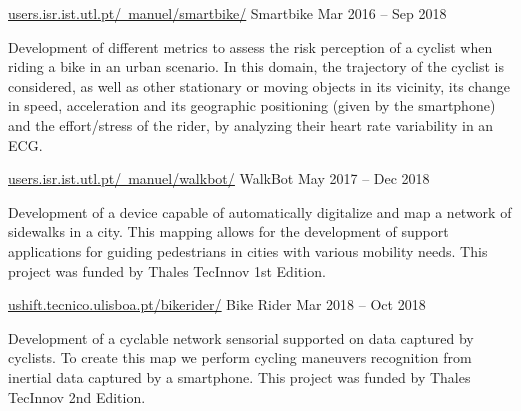 

\begin{cventries}

  \cventrynograde
	{\href{http://users.isr.ist.utl.pt/~manuel/smartbike/}{\underline{users.isr.ist.utl.pt/~manuel/smartbike/}}} %
	{Smartbike} %
	{Mar 2016 – Sep 2018} %
	{
		\begin{cvitems} %
		Development of different metrics to assess the risk perception of a cyclist when riding a bike in an urban scenario. In this domain, the trajectory of the cyclist is considered, as well as other stationary or moving objects in its vicinity, its change in speed, acceleration and its geographic positioning (given by the smartphone) and the effort/stress of the rider, by analyzing their heart rate variability in an ECG.
		\end{cvitems}
	}

  \cventrynograde
	{\href{http://users.isr.ist.utl.pt/~manuel/walkbot/}{\underline{users.isr.ist.utl.pt/~manuel/walkbot/}}} %
	{WalkBot} %
	{May 2017 – Dec 2018} %
	{
		\begin{cvitems} %
			Development of a device capable of automatically digitalize and map a network of sidewalks in a city. This mapping allows for the  development of support applications for guiding pedestrians in cities with various mobility needs. This project was funded by Thales TecInnov 1st Edition.
		\end{cvitems}
	}

\cventrynograde
	{\href{ushift.tecnico.ulisboa.pt/bikerider/}{\underline{ushift.tecnico.ulisboa.pt/bikerider/}}} %
	{Bike Rider} %
	{Mar 2018 – Oct 2018} %
	{
		\begin{cvitems} %
			Development of a cyclable network sensorial supported on data captured by cyclists. To create this map we perform cycling maneuvers recognition from inertial data captured by a smartphone.
			This project was funded by Thales TecInnov 2nd Edition.
		\end{cvitems}
	}


\end{cventries}
